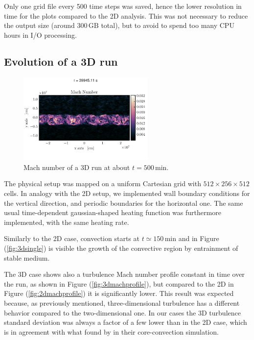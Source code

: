  Only one grid file every 500 time steps was saved, hence the lower resolution in time for the plots compared to the 2D analysis. This was not necessary to reduce the output size (around $300 \, \mathrm{GB}$ total), but to avoid to spend too many CPU hours in I/O processing.
\subsection{Evolution of a 3D run}

\begin{figure}[t!]
\centering
\includegraphics[width=0.6\textwidth]{./img/3dmach.pdf}
\caption{Mach number of a 3D run at about $t=500 \, \mathrm{min}$.}
\label{fig:3dmach}
\end{figure}

The physical setup was mapped on a uniform Cartesian grid with $512 \times 256 \times 512$ cells. In analogy with the 2D setup, we implemented wall boundary conditions for the vertical direction, and periodic boundaries for the horizontal one. The same usual time-dependent gaussian-shaped heating function was furthermore implemented, with the same heating rate.

Similarly to the 2D case, convection starts at $t \simeq 150 \, \mathrm{min}$ and in Figure (\ref{fig:3dsingle}) is visible the growth of the convective region by entrainment of stable medium.

The 3D case shows also a turbulence Mach number profile constant in time over the run, as shown in Figure (\ref{fig:3dmachprofile}), but compared to the 2D in Figure (\ref{fig:2dmachprofile}) it is significantly lower. This result was expected because, as previously mentioned, three-dimensional turbulence has a different behavior compared to the two-dimensional one. In our cases the 3D turbulence standard deviation was always a factor of a few lower than in the 2D case, which is in agreement with what found by \citet{meakin} in their core-convection simulation. 

